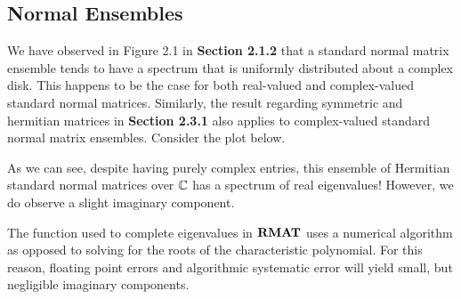 \subsection{Normal Ensembles}

%


We have observed in Figure 2.1 in \textbf{Section 2.1.2} that a standard normal matrix ensemble tends to have a spectrum that is uniformly distributed about a complex disk. This happens to be the case for both real-valued and complex-valued standard normal matrices. Similarly, the result regarding symmetric and hermitian matrices in \textbf{Section 2.3.1} also applies to complex-valued standard normal matrix ensembles. Consider the plot below.


As we can see, despite having purely complex entries, this ensemble of Hermitian standard normal matrices over $\mathbb{C}$ has a spectrum of real eigenvalues!
However, we do observe a slight imaginary component.

\begin{remark}
The  function used to complete eigenvalues in ${\textbf{RMAT}}$ uses a numerical algorithm as opposed to solving for the roots of the characteristic polynomial.
For this reason, floating point errors and algorithmic systematic error will yield small, but negligible imaginary components.
\end{remark}
